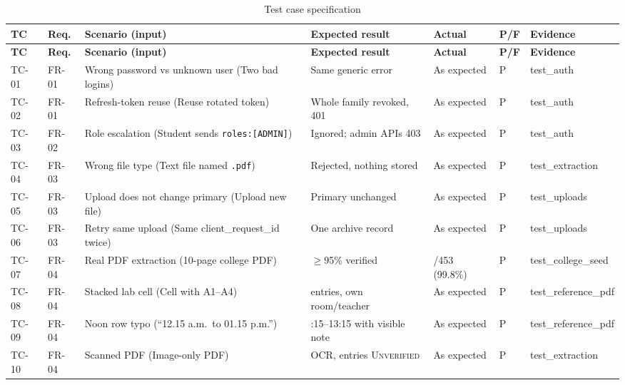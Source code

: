 \begingroup\footnotesize
\setlength{\tabcolsep}{3pt}
\begin{longtable}{@{}p{1.15cm}p{1.2cm}>{\raggedright\arraybackslash}p{4.4cm}>{\raggedright\arraybackslash}p{3.6cm}>{\raggedright\arraybackslash}p{2.1cm}p{0.6cm}>{\raggedright\arraybackslash}p{2.3cm}@{}}
\caption{Test case specification}\label{tab:testcases}\\
\toprule
\textbf{TC} & \textbf{Req.} & \textbf{Scenario (input)} & \textbf{Expected result} & \textbf{Actual} & \textbf{P/F} & \textbf{Evidence}\\
\midrule
\endfirsthead
\toprule
\textbf{TC} & \textbf{Req.} & \textbf{Scenario (input)} & \textbf{Expected result} & \textbf{Actual} & \textbf{P/F} & \textbf{Evidence}\\
\midrule
\endhead
TC-01 & FR-01 & Wrong password vs unknown user (Two bad logins) & Same generic error & As expected & P & test\_\allowbreak{}auth\\
TC-02 & FR-01 & Refresh-token reuse (Reuse rotated token) & Whole family revoked, 401 & As expected & P & test\_\allowbreak{}auth\\
TC-03 & FR-02 & Role escalation (Student sends \texttt{roles:[ADMIN]}) & Ignored; admin APIs 403 & As expected & P & test\_\allowbreak{}auth\\
TC-04 & FR-03 & Wrong file type (Text file named \texttt{.pdf}) & Rejected, nothing stored & As expected & P & test\_\allowbreak{}extraction\\
TC-05 & FR-03 & Upload does not change primary (Upload new file) & Primary unchanged & As expected & P & test\_\allowbreak{}uploads\\
TC-06 & FR-03 & Retry same upload (Same client\_\allowbreak{}request\_\allowbreak{}id twice) & One archive record & As expected & P & test\_\allowbreak{}uploads\\
TC-07 & FR-04 & Real PDF extraction (10-page college PDF) & $\geq$95\% verified & 452/453 (99.8\%) & P & test\_\allowbreak{}college\_\allowbreak{}seed\\
TC-08 & FR-04 & Stacked lab cell (Cell with A1--A4) & 4 entries, own room/teacher & As expected & P & test\_\allowbreak{}reference\_\allowbreak{}pdf\\
TC-09 & FR-04 & Noon row typo (``12.15 a.m.\ to 01.15 p.m.'') & 12:15--13:15 with visible note & As expected & P & test\_\allowbreak{}reference\_\allowbreak{}pdf\\
TC-10 & FR-04 & Scanned PDF (Image-only PDF) & OCR, entries \textsc{Unverified} & As expected & P & test\_\allowbreak{}extraction\\

\end{longtable}
